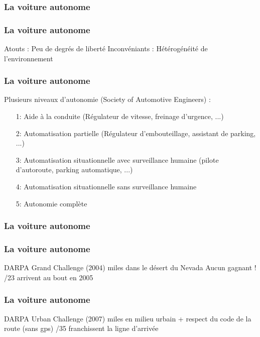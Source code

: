 \begin{frame}
  \frametitle{La voiture autonome}
\end{frame}

\begin{frame}
  \frametitle{La voiture autonome}
  \begin{center}
    Atouts : Peu de degrés de liberté
    \newline
    Inconvéniants : Hétérogénéité de l'environnement
  \end{center}
\end{frame}

\begin{frame}
  \frametitle{La voiture autonome}
  Plusieurs niveaux d'autonomie (Society of Automotive Engineers) :
  \begin{itemize}
  \item[1:] Aide à la conduite (Régulateur de vitesse, freinage d'urgence, ...)
  \item[2:] Automatisation partielle (Régulateur d'embouteillage, assistant de parking, ...)
  \item[3:] Automatisation situationnelle avec surveillance humaine (pilote d'autoroute, parking automatique, ...)
  \item[4:] Automatisation situationnelle sans surveillance humaine
  \item[5:] Autonomie complète
  \end{itemize}
\end{frame}

\begin{frame}
  \frametitle{La voiture autonome}
\end{frame}

\begin{frame}
  \frametitle{La voiture autonome}
  DARPA Grand Challenge (2004)
   miles dans le désert du Nevada
  \newline
  Aucun gagnant !
  /23 arrivent au bout en 2005
\end{frame}

\begin{frame}
  \frametitle{La voiture autonome}
  DARPA Urban Challenge (2007)
   miles en milieu urbain + respect du code de la route (sans gps)
  /35 franchissent la ligne d'arrivée
\end{frame}

